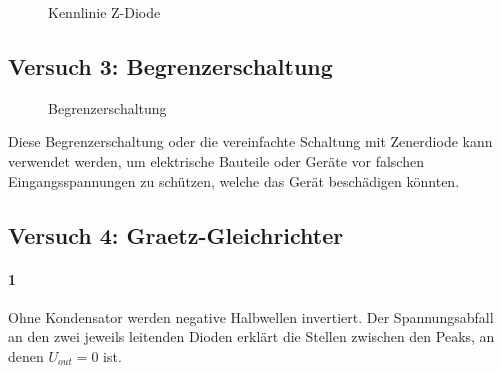 \documentclass[a4paper]{article}
\begin{document}
\begin{figure}[H]
    \centering
    \caption{Kennlinie Z-Diode}
    \label{fig:kennlinie-z}
\end{figure}

\subsection{Versuch 3: Begrenzerschaltung}

\begin{figure}[H]
    \centering
    \caption{Begrenzerschaltung}
    \label{fig:begrenzerschaltung}
\end{figure}

Diese Begrenzerschaltung oder die vereinfachte Schaltung mit Zenerdiode kann verwendet werden, um elektrische Bauteile oder Geräte vor falschen Eingangsspannungen zu schützen, welche das Gerät beschädigen könnten.

\subsection{Versuch 4: Graetz-Gleichrichter}

\paragraph{1}

Ohne Kondensator werden negative Halbwellen invertiert. Der Spannungsabfall an den zwei jeweils leitenden Dioden erklärt die Stellen zwischen den Peaks, an denen $U_{out}=0$ ist.
\end{document}
